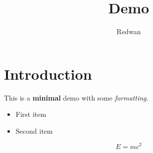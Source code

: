 \documentclass{article}
\title{Demo}
\author{Redwan}
\begin{document}
\maketitle

\section{Introduction}
This is a \textbf{minimal} demo with some \textit{formatting}.

\begin{itemize}
\item First item
\item Second item
\end{itemize}

\begin{equation}
E = mc^2
\end{equation}
\end{document}
